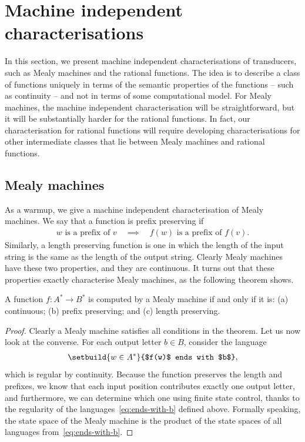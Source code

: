 \section{Machine independent characterisations}
\label{sec:rational-myhill-nerode}

\newcommand{\dist}{\mathrm{d}}

In this section, we present machine independent characterisations of transducers, such as Mealy machines and the rational functions. The idea is to describe a class of functions uniquely in terms of the semantic properties of the functions -- such as continuity -- and not in terms of some computational model. For Mealy machines, the machine independent characterisation will be straightforward, but it will be substantially harder for the rational functions. In fact, our characterisation for rational functions will require developing characterisations for other intermediate classes that lie between Mealy machines and rational functions.

\subsection{Mealy machines}
\label{sec:mealy-machines-independent}
As a warmup, we give a machine independent characterisation of Mealy machines. We say that a function is prefix preserving if
\begin{align*}
\text{$w$ is a prefix of $v$} 
\quad \implies \quad 
\text{$f(w)$ is a prefix of $f(v)$}.
\end{align*}
Similarly, a length preserving function is one in which the length of the input string is the same as the length of the output string. Clearly Mealy machines have these two properties, and they are continuous. It turns out that these properties exactly characterise Mealy machines, as the following theorem shows.


\begin{theorem}\label{thm:mealy-machine-independent}
    A function $f : A^* \to B^*$ is computed by a Mealy machine if and only if it is: (a) continuous; (b) prefix preserving; and (c) length preserving.
\end{theorem}
\begin{proof}
    Clearly a Mealy machine satisfies all conditions in the theorem. Let us now look at the converse. For each output letter $b \in B$, consider the language 
    \begin{align}\label{eq:ends-with-b}
    \setbuild{ w \in A^*}{$f(w)$ ends with $b$},
    \end{align}
    which is regular by continuity.  Because the function preserves the length and prefixes, we know that each input position contributes exactly one output letter, and furthermore, we can determine which one using finite state control, thanks to the regularity of the languages~\eqref{eq:ends-with-b} defined above. Formally speaking, the state space of the Mealy machine is the product of the state spaces of all languages from~\eqref{eq:ends-with-b}.
\end{proof}


